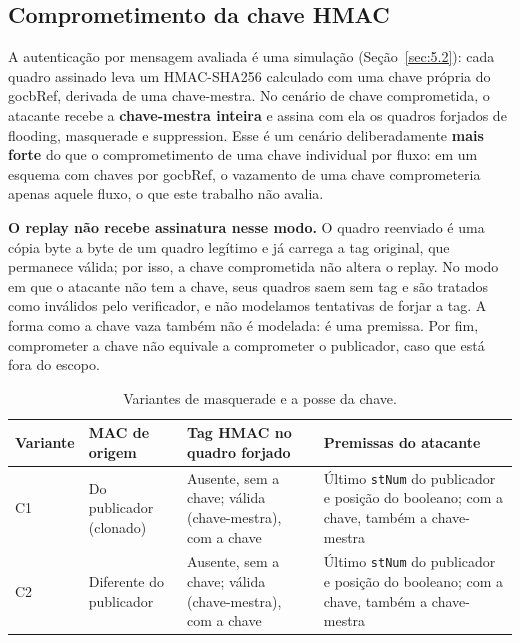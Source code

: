 \documentclass[12pt]{article}
\begin{document}
\subsection{Comprometimento da chave HMAC}\label{sec:3.4}

A autenticação por mensagem avaliada é uma simulação (Seção~\ref{sec:5.2}): cada quadro assinado leva um HMAC-SHA256 calculado com uma chave própria do gocbRef, derivada de uma chave-mestra. No cenário de chave comprometida, o atacante recebe a \textbf{chave-mestra inteira} e assina com ela os quadros forjados de flooding, masquerade e suppression. Esse é um cenário deliberadamente \textbf{mais forte} do que o comprometimento de uma chave individual por fluxo: em um esquema com chaves por gocbRef, o vazamento de uma chave comprometeria apenas aquele fluxo, o que este trabalho não avalia.

\textbf{O replay não recebe assinatura nesse modo.} O quadro reenviado é uma cópia byte a byte de um quadro legítimo e já carrega a tag original, que permanece válida; por isso, a chave comprometida não altera o replay. No modo em que o atacante não tem a chave, seus quadros saem sem tag e são tratados como inválidos pelo verificador, e não modelamos tentativas de forjar a tag. A forma como a chave vaza também não é modelada: é uma premissa. Por fim, comprometer a chave não equivale a comprometer o publicador, caso que está fora do escopo.

\begin{table}[!t]
\centering
\caption{Variantes de masquerade e a posse da chave.}\label{tab:5}
\footnotesize
\renewcommand{\arraystretch}{1.25}
\begin{tabularx}{\linewidth}{|>{\hsize=0.476\hsize\raggedright\arraybackslash}X|>{\hsize=0.681\hsize\raggedright\arraybackslash}X|>{\hsize=1.421\hsize\raggedright\arraybackslash}X|>{\hsize=1.421\hsize\raggedright\arraybackslash}X|}
\hline
\textbf{Variante} & \textbf{MAC de origem} & \textbf{Tag HMAC no quadro forjado} & \textbf{Premissas do atacante} \\ \hline
C1 & Do publicador (clonado) & Ausente, sem a chave; válida (chave-mestra), com a chave & Último \texttt{stNum} do publicador e posição do booleano; com a chave, também a chave-mestra \\ \hline
C2 & Diferente do publicador & Ausente, sem a chave; válida (chave-mestra), com a chave & Último \texttt{stNum} do publicador e posição do booleano; com a chave, também a chave-mestra \\ \hline
\end{tabularx}
\end{table}
\end{document}
